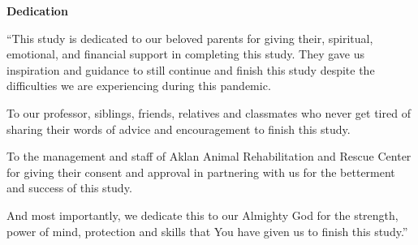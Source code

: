 \begin{center}
	\textbf{Dedication}
\end{center}

	``This study is dedicated to our beloved parents for giving their, spiritual, emotional, and financial support in completing this study. They gave us inspiration and guidance to still continue and finish this study despite the difficulties we are experiencing during this pandemic. 
	
	To our professor, siblings, friends, relatives and classmates who never get tired of sharing their words of advice and encouragement to finish this study. 
	
	To the management and staff of Aklan Animal Rehabilitation and Rescue Center for giving their consent and approval in partnering with us for the betterment and success of this study. 
	
	And most importantly, we dedicate this to our Almighty God for the strength, power of mind, protection and skills that You have given us to finish this study.''